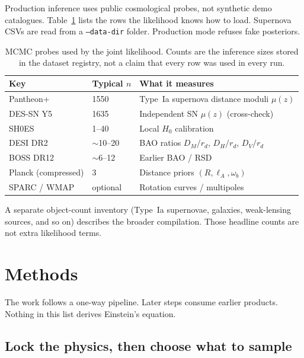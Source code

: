 \documentclass[12pt,letterpaper]{article}
\begin{document}
Production inference uses public cosmological probes, not synthetic
demo catalogues. Table~\ref{tab:probes} lists the rows the likelihood
knows how to load. Supernova CSVs are read from a \texttt{--data-dir}
folder. Production mode refuses fake posteriors.

\begin{table}[H]
\centering
\caption{MCMC probes used by the joint likelihood. Counts are the
inference sizes stored in the dataset registry, not a claim that every
row was used in every run.}
\label{tab:probes}
\begin{tabular}{llp{}}
\toprule
Key & Typical $n$ & What it measures \\
\midrule
Pantheon+      & 1550        & Type~Ia supernova distance moduli $\mu(z)$ \\
DES-SN Y5      & 1635        & Independent SN $\mu(z)$ (cross-check) \\
SH0ES          & 1--40       & Local $H_0$ calibration \\
DESI DR2       & $\sim$10--20 & BAO ratios $D_M/r_d$, $D_H/r_d$, $D_V/r_d$ \\
BOSS DR12      & $\sim$6--12  & Earlier BAO / RSD \\
Planck (compressed) & 3    & Distance priors $(R,\ell_A,\omega_b)$ \\
SPARC / WMAP   & optional    & Rotation curves / multipoles \\
\bottomrule
\end{tabular}
\end{table}

A separate object-count inventory (Type~Ia supernovae, galaxies,
weak-lensing sources, and so on) describes the broader compilation.
Those headline counts are not extra likelihood terms.

\section{Methods}

The work follows a one-way pipeline. Later steps consume earlier
products. Nothing in this list derives Einstein's equation.

\subsection{Lock the physics, then choose what to sample}
\end{document}
